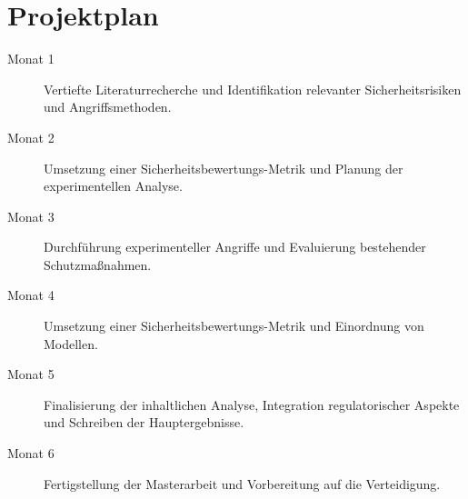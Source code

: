 \documentclass[german,exposee,master]{i1thesis}
\begin{document}
\section{Projektplan}\label{sec:projektplan}


\begin{description}
    \item[Monat 1] Vertiefte Literaturrecherche und Identifikation relevanter Sicherheitsrisiken und Angriffsmethoden.
    
    \item[Monat 2] Umsetzung einer Sicherheitsbewertungs-Metrik und Planung der experimentellen Analyse.
    
    \item[Monat 3] Durchführung experimenteller Angriffe und Evaluierung bestehender Schutzmaßnahmen.
    
    \item[Monat 4] Umsetzung einer Sicherheitsbewertungs-Metrik und Einordnung von Modellen.
    
    \item[Monat 5] Finalisierung der inhaltlichen Analyse, Integration regulatorischer Aspekte und Schreiben der Hauptergebnisse.
    
    \item[Monat 6] Fertigstellung der Masterarbeit und Vorbereitung auf die Verteidigung.
    \end{description}

\printbibliography\
\end{document}
